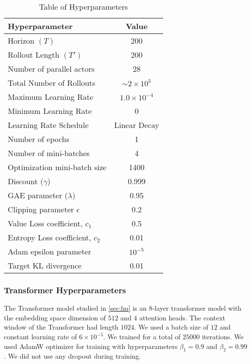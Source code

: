 \begin{table}[ht]
	\centering
	\begin{tabular}{lc}
		\hline
		Hyperparameter & Value \\
		\hline
		Horizon $(T)$ & 200 \\
		Rollout Length $(T')$ & 200 \\
		Number of parallel actors & 28 \\
		Total Number of Rollouts & $\sim 2 \times 10^5$ \\
		Maximum Learning Rate & $1.0 \times 10^{-4}$ \\
		Minimum Learning Rate & 0 \\
		Learning Rate Schedule & Linear Decay \\
		Number of epochs & 1 \\
		Number of mini-batches & 4 \\
		Optimization mini-batch size & 1400 \\
		Discount ($\gamma$) & 0.999 \\
		GAE parameter ($\lambda$) & 0.95 \\
		Clipping parameter $\epsilon$ & 0.2 \\
		Value Loss coefficient, $c_1$ & 0.5 \\
		Entropy Loss coefficient, $c_2$ & 0.01 \\
		Adam epsilon parameter & $10^{-5}$ \\
		Target KL divergence & 0.01 \\
		\hline
	\end{tabular}
	\caption{Table of Hyperparameters}
	\label{tab:ppo_hyperparameters}
\end{table}

\subsubsection*{Transformer Hyperparameters}
The Transformer model studied in \autoref{sec:lm} is an 8-layer transformer model with the embedding space dimension of $512$ and $4$ attention heads. The context window of the Transformer had length $1024$. We used a batch size of $12$ and constant learning rate of $6 \times 10^{-5}$. We trained for a total of $25000$ iterations. We used AdamW optimizer for training with hyperparameters $\beta_1 = 0.9$ and $\beta_2 = 0.99$. We did not use any dropout during training.